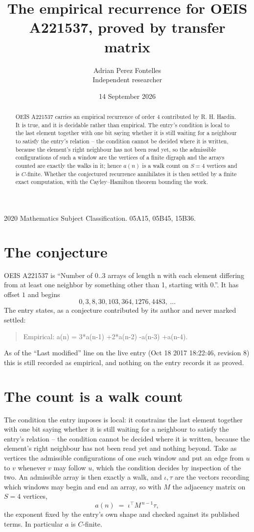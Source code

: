 \documentclass[11pt,a4paper]{article}
\title{The empirical recurrence for OEIS A221537, proved by transfer matrix}
\author{Adrian Perez Fontelles\\ \small Independent researcher}
\date{14 September 2026}
\theoremstyle{plain}
\theoremstyle{definition}
\begin{document}
\maketitle

\begin{abstract}
OEIS A221537 carries an empirical recurrence of order $4$ contributed by R. H. Hardin. It is
true, and it is decidable rather than empirical. The entry's condition is local to the last element together with one bit saying whether it is still waiting for a neighbour to satisfy the entry's relation -- the condition cannot be decided where it is written, because the element's right neighbour has not been read yet, so
the admissible configurations of such a window are the vertices of a finite digraph and the
arrays counted are exactly the walks in it; hence $a(n)$ is a walk count on $S=4$ vertices
and is $C$-finite. Whether the conjectured recurrence annihilates it is then settled by a
finite exact computation, with the Cayley--Hamilton theorem bounding the work.
\end{abstract}

\noindent\small 2020 Mathematics Subject Classification. 05A15, 05B45, 15B36.\normalsize

\section{The conjecture}

OEIS A221537 is ``Number of 0..3 arrays of length n with each element differing from at least one neighbor by something other than 1, starting with 0.''. It has offset $1$ and begins
\[
0, 3, 8, 30, 103, 364, 1276, 4483,\ \dots
\]
The entry states, as a conjecture contributed by its author and never marked settled:
\begin{quote}
Empirical: a(n) = 3*a(n-1) +2*a(n-2) -a(n-3) +a(n-4).
\end{quote}
As of the ``Last modified'' line on the live entry (Oct 18 2017 18:22:46, revision 8) this is still
recorded as empirical, and nothing on the entry records it as proved.

\section{The count is a walk count}

The condition the entry imposes is local: it constrains the last element together with one bit saying whether it is still waiting for a neighbour to satisfy the entry's relation -- the condition cannot be decided where it is written, because the element's right neighbour has not been read yet and nothing beyond. Take as vertices the admissible configurations of one such window and put an edge from $u$ to $v$ whenever $v$ may follow $u$, which the condition decides by inspection of the two.
An admissible array is then exactly a walk, and $\iota,\tau$ are the vectors recording which windows may begin and end an array, so with $M$ the adjacency matrix on $S=4$ vertices,
\[
a(n)\;=\;\iota^{\!\top}M^{\,n-1}\tau ,
\]
the exponent fixed by the entry's own shape and checked against its published terms. In
particular $a$ is $C$-finite.
\end{document}

